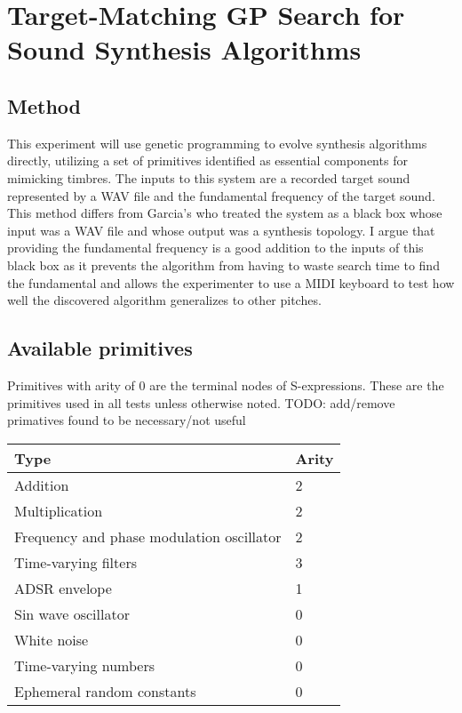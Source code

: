 \documentclass[12pt]{article}
\begin{document}
\section{Target-Matching GP Search for Sound Synthesis Algorithms}
\subsection{Method}
This experiment will use genetic programming to evolve synthesis algorithms directly, utilizing a set of primitives identified as essential components for mimicking timbres. The inputs to this system are a recorded target sound represented by a WAV file and the fundamental frequency of the target sound. This method differs from Garcia's who treated the system as a black box whose input was a WAV file and whose output was a synthesis topology. I argue that providing the fundamental frequency is a good addition to the inputs of this black box as it prevents the algorithm from having to waste search time to find the fundamental and allows the experimenter to use a MIDI keyboard to test how well the discovered algorithm generalizes to other pitches.
\subsection{Available primitives}
Primitives with arity of $0$ are the terminal nodes of S-expressions. These are the primitives used in all tests unless otherwise noted. TODO: add/remove primatives found to be necessary/not useful
\begin{center}
\begin{tabular}{ | l | l | } \hline
Type & Arity \\ \hline
Addition & 2 \\ \hline
Multiplication & 2 \\ \hline
Frequency and phase modulation oscillator & 2 \\ \hline
Time-varying filters & 3 \\ \hline
ADSR envelope & 1 \\ \hline
Sin wave oscillator & 0 \\ \hline
White noise & 0 \\ \hline
Time-varying numbers & 0 \\ \hline
Ephemeral random constants & 0 \\ \hline
\end{tabular}
\end{center}
\end{document}

